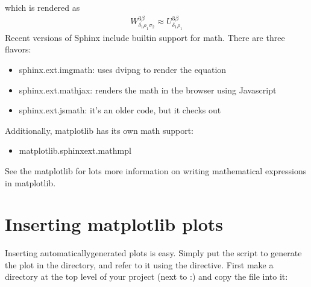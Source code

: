 \documentclass[letterpaper,10pt,english]{sphinxmanual}
\begin{document}
which is rendered as
\begin{equation*}
\begin{split}W^{3\beta}_{\delta_1 \rho_1 \sigma_2} \approx U^{3\beta}_{\delta_1 \rho_1}\end{split}
\end{equation*}
Recent versions of Sphinx include built\sphinxhyphen{}in support for math.
There are three flavors:
\begin{itemize}
\item {} 
sphinx.ext.imgmath: uses dvipng to render the equation

\item {} 
sphinx.ext.mathjax: renders the math in the browser using Javascript

\item {} 
sphinx.ext.jsmath: it’s an older code, but it checks out

\end{itemize}

Additionally, matplotlib has its own math support:
\begin{itemize}
\item {} 
matplotlib.sphinxext.mathmpl

\end{itemize}

See the matplotlib  for lots
more information on writing mathematical expressions in matplotlib.


\section{Inserting matplotlib plots}
\label{\detokenize{chapter2:inserting-matplotlib-plots}}\label{\detokenize{chapter2:pyplots}}
Inserting automatically\sphinxhyphen{}generated plots is easy.  Simply put the
script to generate the plot in the  directory, and
refer to it using the  directive.  First make a
 directory at the top level of your project (next to
:) and copy the  file into it:

\begin{sphinxVerbatim}[commandchars=\\\{\}]
  
   
\end{sphinxVerbatim}
\end{document}
